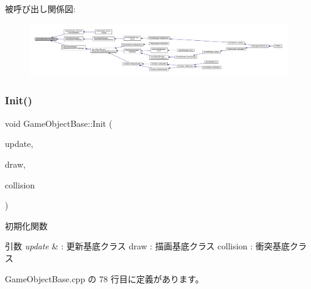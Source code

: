 被呼び出し関係図\+:
\nopagebreak
\begin{figure}[H]
\begin{center}
\leavevmode
\includegraphics[width=350pt]{class_game_object_base_a177985be1be1252df6588fa29f2c7f41_icgraph}
\end{center}
\end{figure}
\mbox{\label{class_game_object_base_aca14cf5d66f945347653c4965876e75b}} 
\subsubsection{\texorpdfstring{Init()}{Init()}}
{\footnotesize\ttfamily void Game\+Object\+Base\+::\+Init (\begin{DoxyParamCaption}\item[{\mbox{\hyperlink{class_update_base}{Update\+Base}} $\ast$}]{update,  }\item[{\mbox{\hyperlink{class_draw_base}{Draw\+Base}} $\ast$}]{draw,  }\item[{\mbox{\hyperlink{class_collision_base}{Collision\+Base}} $\ast$}]{collision }\end{DoxyParamCaption})\hspace{0.3cm}{\ttfamily [protected]}}



初期化関数 


\begin{DoxyParams}{引数}
{\em update} & \+: 更新基底クラス draw \+: 描画基底クラス collision \+: 衝突基底クラス \\
\hline
\end{DoxyParams}


 Game\+Object\+Base.\+cpp の 78 行目に定義があります。

